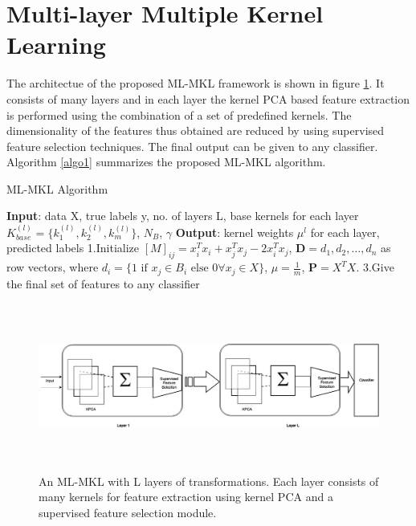 \section{Multi-layer Multiple Kernel Learning}
\label{sec_mlmkl}
The architectue of the proposed ML-MKL framework is shown in figure \ref{fig_mlmkl}. It consists of many layers and in each layer the kernel PCA based feature extraction is performed using the combination of a set of predefined kernels. The dimensionality of the features thus obtained are reduced by using supervised feature selection techniques. The final output can be given to any classifier. Algorithm \ref{algo1} summarizes the proposed ML-MKL algorithm.

\begin{algorithm}
\caption{ML-MKL Algorithm}
\textbf{Input}: data X, true labels y, no. of layers L, base kernels for each layer $K_{base}^{(l)} = \{k_1^{(l)}, k_2^{(l)}, k_m^{(l)}\}$, $N_B$, $\gamma$\;
\textbf{Output}: kernel weights $\mu^l$ for each layer, predicted labels\;
1.Initialize $[M]_{ij} = x_i^Tx_i + x_j^Tx_j - 2x_i^Tx_j$, $\bm{D} = d_1, d_2, \ldots, d_n$ as row vectors, where $d_i = \{1 \textrm{ if } x_j \in B_i \textrm{ else } 0 \forall x_j \in X \}$, $\mu = \frac{1}{m}$, $\bm{P} = X^TX$.
3.Give the final set of features to any classifier\;
\label{algo1}
\end{algorithm}

\begin{figure}
  \centering
  \captionsetup{justification=centering,margin=0.1cm}
  \includegraphics[width=1.0\textwidth,height=5.5cm]{figures/mlmkm}
  \caption{An ML-MKL with L layers of transformations. Each layer consists of many kernels for feature  extraction using kernel PCA and a supervised feature selection module.}
  \label{fig_mlmkl}
\end{figure}

